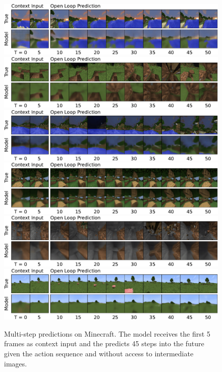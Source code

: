 \begin{figure}[ht!]
\centering
\includegraphics[width=\linewidth,trim={0 .5cm 0 0},clip]{openl/mine1} \\[1ex]
\includegraphics[width=\linewidth,trim={0 .5cm 0 .5cm},clip]{openl/mine2} \\[1ex]
\includegraphics[width=\linewidth,trim={0 .5cm 0 .5cm},clip]{openl/mine3} \\[1ex]
\includegraphics[width=\linewidth,trim={0 .5cm 0 .5cm},clip]{openl/mine4} \\[1ex]
\includegraphics[width=\linewidth,trim={0 .5cm 0 .5cm},clip]{openl/mine5} \\[1ex]
\includegraphics[width=\linewidth,trim={0 0 0 .5cm},clip]{openl/mine6} \\[1ex]
\caption{Multi-step predictions on Minecraft. The model receives the first 5 frames as context input and the predicts 45 steps into the future given the action sequence and without access to intermediate images.}
\label{fig:openl_more}
\end{figure}
